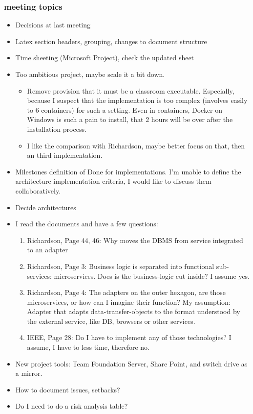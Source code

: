 \documentclass{article}
\begin{document}
\subsubsection{meeting topics}
\begin{itemize}
    \item Decisions at last meeting
    \item Latex section headers, grouping, changes to document structure
    \item Time sheeting (Microsoft Project), check the updated sheet
    \item Too ambitious project, maybe scale it a bit down.
        \begin{itemize}
            \item Remove provision that it must be a classroom executable. Especially, because I suspect that the implementation is too complex (involves easily to 6 containers) for such a setting. Even in containers, Docker on Windows is such a pain to install, that 2 hours will be over after the installation process.
            \item I like the comparison with Richardson, maybe better focus on that, then an third implementation.
        \end{itemize}
    \item Milestones definition of Done for implementations. I'm unable to define the architecture implementation criteria, I would like to discuss them collaboratively.
    \item Decide architectures
    \item I read the documents and have a few questions:
        \begin{enumerate}
            \item Richardson, Page 44, 46: Why moves the DBMS from service integrated to an adapter
            \item Richardson, Page 3: Business logic is separated into functional sub-services: microservices. Does is the business-logic cut inside? I assume yes.
            \item Richardson, Page 4: The adapters on the outer hexagon, are those microservices, or how can I imagine their function? My assumption: Adapter that adapts data-transfer-objects to the format understood by the external service, like DB, browsers or other services. 
            \item IEEE, Page 28: Do I have to implement any of those technologies? I assume, I have to less time, therefore no.
        \end{enumerate}
    \item New project tools: Team Foundation Server, Share Point, and switch drive as a mirror.
    \item How to document issues, setbacks?
    \item Do I need to do a risk analysis table?
\end{itemize}
\end{document}
